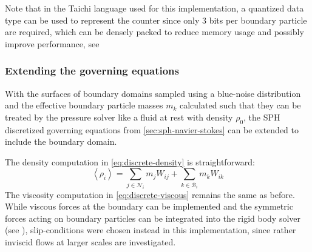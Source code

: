\documentclass[oneside, a4paper]{book}
\newcommand\angled[1]{\left\langle#1\right\rangle}
\begin{document}
    Note that in the Taichi language used for this implementation, a quantized data type can be used to represent the counter since only 3 bits per boundary particle are required, which can be densely packed to reduce memory usage and possibly improve performance, see \autocite[Hu et al.]{quantized-taichi}

    \subsubsection{Extending the governing equations}
    With the surfaces of boundary domains sampled using a blue-noise distribution and the effective boundary particle masses $m_k$ calculated such that they can be treated by the pressure solver like a fluid at rest with density $\rho_0$, the SPH discretized governing equations from \autoref{sec:sph-navier-stokes} can be extended to include the boundary domain.


    The density computation in \autoref{eq:discrete-density} is straightforward:
    \begin{equation}\label{eq:discrete-density-boundary}
      \angled{\rho_i} = \sum_{j\in\mathcal{N}_i} m_j W_{ij} + \sum_{k\in\mathcal{B}_i} m_k W_{ik}
    \end{equation}
    The viscosity computation in \autoref{eq:discrete-viscous} remains the same as before. While viscous forces at the boundary can be implemented and the symmetric forces acting on boundary particles can be integrated into the rigid body solver (see \autocite[Akinci et al.]{versatile-boundary-akinci}), slip-conditions were chosen instead in this implementation, since rather inviscid flows at larger scales are investigated.
\end{document}
